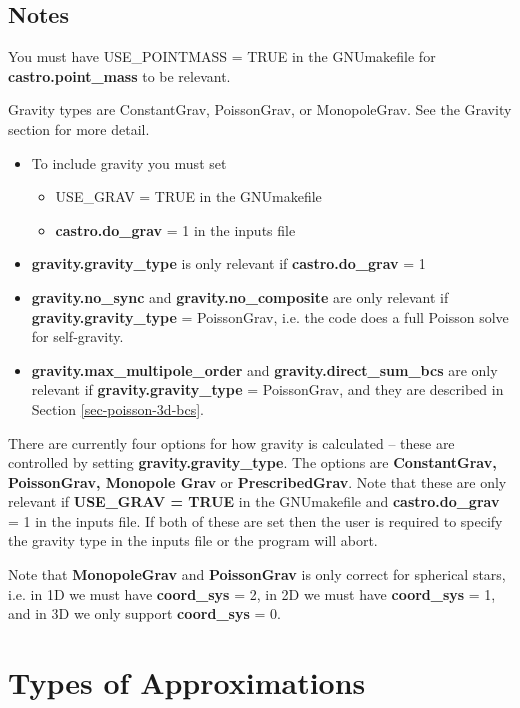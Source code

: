 \subsection{Notes}

    You must have USE\_POINTMASS = TRUE in the GNUmakefile for {\bf
      castro.point\_mass} to be relevant.
    
Gravity types are ConstantGrav, PoissonGrav, or MonopoleGrav.  See the Gravity section for more detail.

\begin{itemize}
\item To include gravity you must set 
\begin{itemize}
\item USE\_GRAV  = TRUE in the GNUmakefile 
\item {\bf castro.do\_grav} = 1 in the inputs file
\end{itemize}
\item {\bf gravity.gravity\_type} is  only relevant if {\bf castro.do\_grav} = 1 
\item {\bf gravity.no\_sync} and {\bf gravity.no\_composite} are only relevant if {\bf gravity.gravity\_type} = PoissonGrav,
i.e. the code does a full Poisson solve for self-gravity.
\item {\bf gravity.max\_multipole\_order} and {\bf gravity.direct\_sum\_bcs} are only relevant if {\bf gravity.gravity\_type} = PoissonGrav,
and they are described in Section \ref{sec-poisson-3d-bcs}.
\end{itemize}


There are currently four options for how gravity is calculated -- 
these are controlled by setting {\bf gravity.gravity\_type}.  
The options are {\bf ConstantGrav, PoissonGrav, Monopole Grav} or {\bf PrescribedGrav}.
Note that these are only relevant if {\bf USE\_GRAV = TRUE} in the GNUmakefile
and {\bf castro.do\_grav} = 1 in the inputs file.  If both of these are
set then the user is required to specify the gravity type in the inputs file
or the program will abort. 

Note that {\bf MonopoleGrav} and {\bf PoissonGrav} is only correct for 
spherical stars, i.e. in 1D we must have {\bf coord\_sys} = 2, 
in 2D we must have {\bf coord\_sys} = 1, and in 3D we only support {\bf coord\_sys} = 0.

\section{Types of Approximations}

